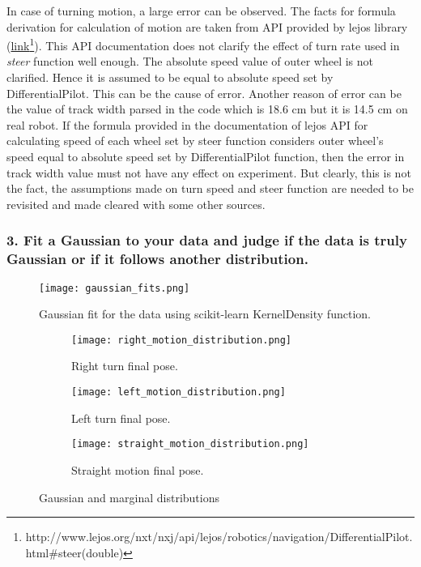 In case of turning motion, a large error can be observed. The facts for formula derivation for calculation of motion are taken from API provided by lejos library (\href{http://www.lejos.org/nxt/nxj/api/lejos/robotics/navigation/DifferentialPilot.html#steer(double)}{link}\footnote{http://www.lejos.org/nxt/nxj/api/lejos/robotics/navigation/DifferentialPilot.html$\#$steer(double)}). This API documentation does not clarify the effect of turn rate used in \textit{steer} function well enough. The absolute speed value of outer wheel is not clarified. Hence it is assumed to be equal to absolute speed set by DifferentialPilot. This can be the cause of error.
Another reason of error can be the value of track width parsed in the code which is 18.6 cm but it is 14.5 cm on real robot.
If the formula provided in the documentation of lejos API for calculating speed of each wheel set by steer function considers outer wheel's speed equal to absolute speed set by DifferentialPilot function, then the error in track width value must not have any effect on experiment. But clearly, this is not the fact, the assumptions made on turn speed and steer function are needed to be revisited and made cleared with some other sources.      

\newpage
\subsubsection*{3. Fit a Gaussian to your data and judge if the data is truly Gaussian or if it follows another distribution.}

\begin{figure}[ht]
\centering
\texttt{[image: gaussian\_fits.png]}
\caption{Gaussian fit for the data using scikit-learn KernelDensity function. }
\label{gaussian}
\end{figure}


\begin{figure}[H]
\centering
\begin{subfigure}[b]{0.3\textwidth}
\texttt{[image: right\_motion\_distribution.png]}
\caption{Right turn final pose.}
\label{distribution-right-turn}
\end{subfigure}
\qquad
\begin{subfigure}[b]{0.3\textwidth}
\texttt{[image: left\_motion\_distribution.png]}
\caption{Left turn final pose.}
\label{distribution-right-turn}
\end{subfigure}
\qquad
\begin{subfigure}[b]{0.3\textwidth}
\texttt{[image: straight\_motion\_distribution.png]}
\caption{Straight motion final pose.}
\label{distribution-straight-motion}
\end{subfigure}
\caption{Gaussian and marginal distributions }
\end{figure}

